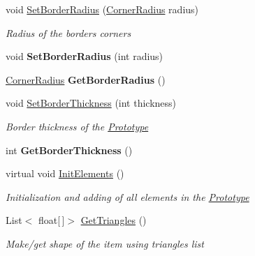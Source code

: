 \begin{DoxyCompactItemize}
\item 
void \mbox{\hyperlink{class_space_v_i_l_1_1_prototype_a8d472c2323f8c6bbdb39fb238bb6cff4}{Set\+Border\+Radius}} (\mbox{\hyperlink{class_space_v_i_l_1_1_decorations_1_1_corner_radius}{Corner\+Radius}} radius)
\begin{DoxyCompactList}\small\item\em Radius of the border\textquotesingle{}s corners \end{DoxyCompactList}\item 
\mbox{\label{class_space_v_i_l_1_1_prototype_a716d67b9dca43665a57bd649fea69820}} 
void {\bfseries Set\+Border\+Radius} (int radius)
\item 
\mbox{\label{class_space_v_i_l_1_1_prototype_a92e4a1777c159ff5e80f228c3bad181b}} 
\mbox{\hyperlink{class_space_v_i_l_1_1_decorations_1_1_corner_radius}{Corner\+Radius}} {\bfseries Get\+Border\+Radius} ()
\item 
void \mbox{\hyperlink{class_space_v_i_l_1_1_prototype_a3409ace379b42bc27dc088ea3b5d2c16}{Set\+Border\+Thickness}} (int thickness)
\begin{DoxyCompactList}\small\item\em Border thickness of the \mbox{\hyperlink{class_space_v_i_l_1_1_prototype}{Prototype}} \end{DoxyCompactList}\item 
\mbox{\label{class_space_v_i_l_1_1_prototype_a60b8f834323155b30fa65cc6cadc7919}} 
int {\bfseries Get\+Border\+Thickness} ()
\item 
virtual void \mbox{\hyperlink{class_space_v_i_l_1_1_prototype_ac3379fe02923ee155b5b0084abf27420}{Init\+Elements}} ()
\begin{DoxyCompactList}\small\item\em Initialization and adding of all elements in the \mbox{\hyperlink{class_space_v_i_l_1_1_prototype}{Prototype}} \end{DoxyCompactList}\item 
List$<$ float\mbox{[}$\,$\mbox{]}$>$ \mbox{\hyperlink{class_space_v_i_l_1_1_prototype_af033781dfb15abb603274625f90d97de}{Get\+Triangles}} ()
\begin{DoxyCompactList}\small\item\em Make/get shape of the item using triangles list \end{DoxyCompactList}\item 

\end{DoxyCompactItemize}
